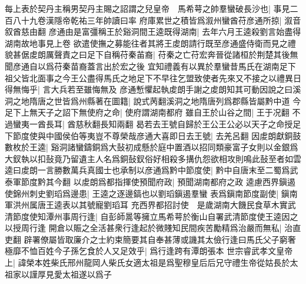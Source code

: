 每上表於契丹主稱男契丹主賜之詔謂之兒皇帝　馬希萼之帥羣蠻破長沙也|{
	事見二百八十九卷漢隱帝乾祐三年帥讀曰率}
府庫累世之積皆爲溆州蠻酋苻彦通所掠|{
	溆音叙酋慈由翻}
彦通由是富彊稱王於谿洞間王逵既得湖南|{
	去年六月王逵殺劉言始盡得湖南故地事見上卷}
欲遣使撫之募能往者其將王䖍朗請行既至彦通盛侍衛而見之禮貌甚倨䖍朗厲聲責之曰足下自稱苻秦苖裔|{
	苻秦之亡苻宏奔晉從諸桓於荆楚其後無聞彦通自以爲苻秦苗裔蓋言出於宏之後}
宜知禮義有以異於羣蠻昔馬氏在湖南足下祖父皆北面事之今王公盡得馬氏之地足下不早往乞盟致使者先來又不接之以禮異日得無悔乎|{
	言大兵若至雖悔無及}
彦通慙懼起執䖍朗手謝之䖍朗知其可動因說之曰溪洞之地隋唐之世皆爲州縣著在圖籍|{
	說式苪翻溪洞之地隋唐列爲郡縣皆屬黔中道}
今足下上無天子之詔下無使府之命|{
	使府謂湖南都府}
雖自王於山谷之間|{
	王于况翻}
不過蠻夷一酋長耳|{
	酋慈秋翻長知兩翻}
曷若去王號自歸於王公王公必以天子之命授足下節度使與中國侯伯等夷豈不尊榮哉彦通大喜即日去王號|{
	去羌呂翻}
因䖍朗獻銅鼓數枚於王逵|{
	谿洞諸蠻鑄銅爲大鼔初成懸於庭中置酒以招同類豪富子女則以金銀爲大釵執以扣鼔竟乃留遺主人名爲銅鼔釵俗好相殺多搆仇怨欲相攻則鳴此鼔至者如雲}
逵曰䖍朗一言勝數萬兵真國士也承制以彦通爲黔中節度使|{
	黔中自唐末至二蜀爲武泰軍節度黔其今翻}
以䖍朗爲都指揮使預聞府政|{
	預聞湖南都府之政}
逵慮西界鎭遏使錦州刺史劉瑫爲邊患|{
	王逵之逐邊鎬也以劉瑫鎭遏羣蠻}
表爲鎭南節度副使|{
	鎭南軍洪州属唐王逵表以其號寵劉瑫耳}
充西界都招討使　是歲湖南大饑民食草木實武清節度使知潭州事周行逢|{
	自彭師暠等擁立馬希萼於衡山自署武清節度使王逵因之以授周行逢}
開倉以賑之全活甚衆行逢起於微賤知民間疾苦勵精爲治嚴而無私|{
	治直吏翻}
辟署僚屬皆取廉介之士約束簡要其自奉甚薄或譏其太儉行逢曰馬氏父子窮奢極靡不恤百姓今子孫乞食於人又足效乎|{
	爲行逢跨有潭朗張本}
世宗睿武孝文皇帝上|{
	諱榮本姓柴氏邢州龍岡人柴氏女適太祖是爲聖穆皇后后兄守禮生帝從姑長於太祖家以謹厚見愛太祖遂以爲子}


